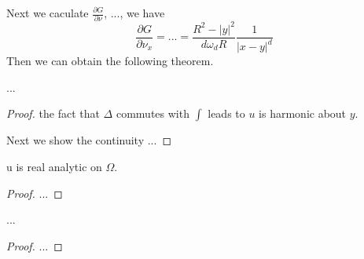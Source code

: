 \documentclass{simplenotes}
\begin{document}
Next we caculate $\frac{\partial G}{\partial \nu}$, ..., we have 
\begin{equation}
\frac{\partial G}{\partial \nu_x}=...=\frac{R^2-|y|^2}{d\omega_dR}\frac1{|x-y|^d}
\end{equation}
Then we can obtain the following theorem.

\begin{theorem}
...
\begin{proof}

the fact that $\Delta$  commutes with $\int$ leads to $u$ is harmonic about $y$.

Next we show the continuity ...
\end{proof}
\end{theorem}

\begin{corollary}[smoothness]
u is real analytic on $\Omega$.
\begin{proof}
...
\end{proof}
\end{corollary}

\begin{corollary}[uniqueness]
...
\begin{proof}
...
\end{proof}
\end{corollary}
\end{document}
